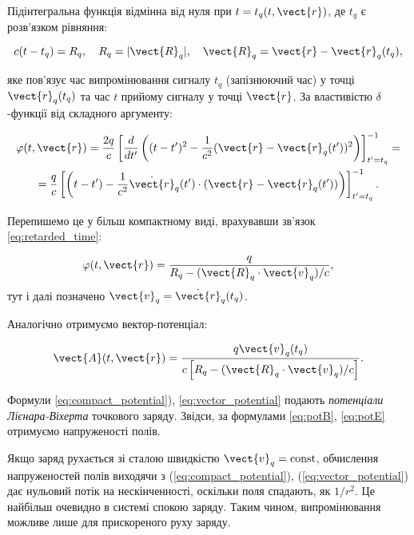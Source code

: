 Підінтегральна функція відмінна від нуля при \( t = t_q (t, \vect{r}) \), де \( t_q \) є розв’язком рівняння:

\begin{equation}\label{eq:retarded_time}
	c(t - t_q) = R_q, \quad R_q = |\vect{R}_q|, \quad \vect{R}_q = \vect{r} - \vect{r}_q (t_q),
\end{equation}

яке пов'язує час випромінювання сигналу \( t_q \) (запізнюючий час) у точці \( \vect{r}_q (t_q) \) та час \( t \) прийому сигналу у точці \( \vect{r}
\). За властивістю \(\delta\)-функції від складного аргументу:

\begin{multline}\label{eq:4.1.4}
	\varphi(t, \vect{r}) = \frac{2q}{c} \left[ \frac{d}{dt'} \left( (t - t')^2 - \frac{1}{c^2} (\vect{r} - \vect{r}_q (t'))^2 \right) \right]_{t' =
	t_q}^{-1} = \\
    = \frac{q}{c} \left[ \left( t - t') - \frac{1}{c^2} \dot{\vect{r}}_q (t') \cdot (\vect{r} - \vect{r}_q (t')) \right) \right]_{t' = t_q}^{-1}.
\end{multline}

Перепишемо це у більш компактному виді, врахувавши зв'язок \eqref{eq:retarded_time}:

\begin{equation}
	\varphi(t, \vect{r}) = \frac{q}{R_q - (\vect{R}_q \cdot \vect{v}_q)/c},
	\label{eq:compact_potential}
\end{equation}
тут і далі позначено \( \vect{v}_q = \dot{\vect{r}}_q (t_q) \).

Аналогічно отримуємо вектор-потенціал:

\begin{equation}
	\vect{A}(t, \vect{r}) = \frac{q \vect{v}_q (t_q)}{c \left[ R_q - (\vect{R}_q \cdot \vect{v}_q)/c \right]}.
	\label{eq:vector_potential}
\end{equation}

Формули \eqref{eq:compact_potential}), \eqref{eq:vector_potential} подають \textit{потенціали Лієнара-Віхерта} точкового заряду. Звідси, за формулами
\eqref{eq:potB}, \eqref{eq:potE} отримуємо напруженості полів.

Якщо заряд рухається зі сталою швидкістю \( \vect{v}_q = \text{const} \), обчислення напруженостей полів виходячи з (\ref{eq:compact_potential}),
(\ref{eq:vector_potential}) дає нульовий потік на нескінченності, оскільки поля спадають, як \( 1/r^2 \). Це найбільш очевидно в системі спокою заряду.
Таким чином, випромінювання можливе лише для прискореного руху заряду.

